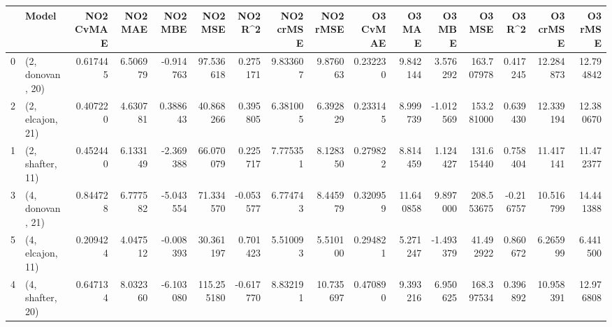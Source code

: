 \begin{tabular}{llrrrrrrrrrrrrrr}
\toprule
{} &             Model &  NO2 CvMAE &   NO2 MAE &   NO2 MBE &     NO2 MSE &   NO2 R\textasciicircum2 &  NO2 crMSE &   NO2 rMSE &  O3 CvMAE &     O3 MAE &    O3 MBE &      O3 MSE &    O3 R\textasciicircum2 &   O3 crMSE &    O3 rMSE \\
\midrule
0 &  (2, donovan, 20) &   0.617445 &  6.506979 & -0.914763 &   97.536618 &  0.275171 &   9.833607 &   9.876063 &  0.232230 &   9.842144 &  3.576292 &  163.707978 &  0.417245 &  12.284873 &  12.794842 \\
2 &  (2, elcajon, 21) &   0.407220 &  4.630781 &  0.388643 &   40.868266 &  0.395805 &   6.381005 &   6.392829 &  0.233145 &   8.999739 & -1.012569 &  153.281000 &  0.639430 &  12.339194 &  12.380670 \\
1 &  (2, shafter, 11) &   0.452440 &  6.133149 & -2.369388 &   66.070079 &  0.225717 &   7.775351 &   8.128350 &  0.279822 &   8.814459 &  1.124427 &  131.615440 &  0.758404 &  11.417141 &  11.472377 \\
3 &  (4, donovan, 21) &   0.844728 &  6.777582 & -5.043554 &   71.334570 & -0.053577 &   6.774743 &   8.445979 &  0.320959 &  11.640858 &  9.897000 &  208.553675 & -0.216757 &  10.516799 &  14.441388 \\
5 &  (4, elcajon, 11) &   0.209424 &  4.047512 & -0.008393 &   30.361197 &  0.701423 &   5.510093 &   5.510100 &  0.294821 &   5.271247 & -1.493379 &   41.492922 &  0.860672 &   6.265999 &   6.441500 \\
4 &  (4, shafter, 20) &   0.647134 &  8.032360 & -6.103080 &  115.255180 & -0.617770 &   8.832191 &  10.735697 &  0.470890 &   9.393216 &  6.950625 &  168.397534 &  0.396892 &  10.958391 &  12.976808 \\
\bottomrule
\end{tabular}
